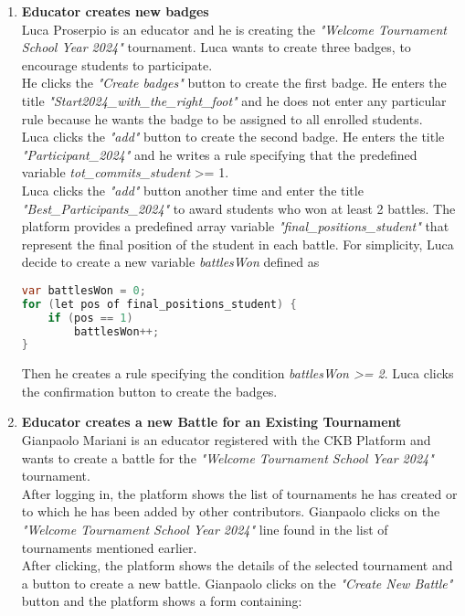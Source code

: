 \begin{enumerate}
	\item \textbf{Educator creates new badges}\\
	      Luca Proserpio is an educator and he is creating the \emph{"Welcome Tournament School Year 2024"} tournament.
	      Luca wants to create three badges, to encourage students to participate.\\
	      He clicks the \emph{"Create badges"} button to create the first badge.
	      He enters the title \emph{"Start2024_with_the_right_foot"} and he does not enter any particular rule because he wants the badge to be assigned to all enrolled students.\\
	      Luca clicks the \emph{"add"} button to create the second badge.
	      He enters the title \emph{"Participant_2024"} and he writes a rule specifying that the predefined variable \emph{tot_commits_student} >= 1.\\
	      Luca clicks the \emph{"add"} button another time and enter the title \emph{"Best_Participants_2024"} to award students who won at least 2 battles.
	      The platform provides a predefined array variable \emph{"final_positions_student"} that represent the final position of the student in each battle.
	      For simplicity, Luca decide to create a new variable \emph{battlesWon} defined as
	      \begin{lstlisting}[language=java, morekeywords={var, let, of}, keywordstyle=\color{blue}]
var battlesWon = 0;
for (let pos of final_positions_student) {
	if (pos == 1)
		battlesWon++;
}
		  \end{lstlisting}
	      Then he creates a rule specifying the condition \emph{battlesWon >= 2}.
	      Luca clicks the confirmation button to create the badges.


	\item \textbf{Educator creates a new Battle for an Existing Tournament}\\
	      Gianpaolo Mariani is an educator registered with the CKB Platform and wants to create a battle for the \emph{"Welcome Tournament School Year 2024"} tournament.\\
	      After logging in, the platform shows the list of tournaments he has created or to which he has been added by other contributors. Gianpaolo clicks on the \emph{"Welcome
		      Tournament School Year 2024"} line found in the list of tournaments mentioned earlier.\\
	      After clicking, the platform shows the details of the selected tournament and a button to create a new battle.
	      Gianpaolo clicks on the \emph{"Create New Battle"} button and the platform shows a form containing:


\end{enumerate}
